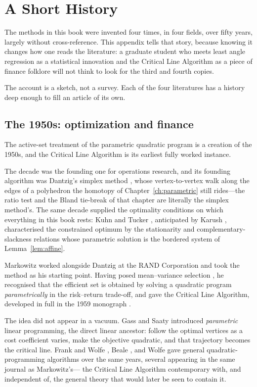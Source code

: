 \chapter{A Short History}
\label{app:history}

The methods in this book were invented four times, in four fields, over fifty years,
largely without cross-reference. This appendix tells that story, because knowing it
changes how one reads the literature: a graduate student who meets least angle
regression as a statistical innovation and the Critical Line Algorithm as a piece of
finance folklore will not think to look for the third and fourth copies.

The account is a sketch, not a survey. Each of the four literatures has a history deep
enough to fill an article of its own.

\section{The 1950s: optimization and finance}

The active-set treatment of the parametric quadratic program is a creation of the
1950s, and the Critical Line Algorithm is its earliest fully worked instance.

The decade was the founding one for operations research, and its founding algorithm was
Dantzig's simplex method \cite{dantzig1951}, whose vertex-to-vertex walk along the edges
of a polyhedron the homotopy of Chapter~\ref{ch:parametric} still rides---the ratio test
and the Bland tie-break of that chapter are literally the simplex method's. The same
decade supplied the optimality conditions on which everything in this book rests:
Kuhn and Tucker \cite{kuhntucker1951}, anticipated by Karush \cite{karush1939},
characterised the constrained optimum by the stationarity and complementary-slackness
relations whose parametric solution is the bordered system of
Lemma~\ref{lem:affine}.

Markowitz worked alongside Dantzig at the RAND Corporation and took the method as his
starting point. Having posed mean--variance selection \cite{markowitz1952}, he
recognised that the efficient set is obtained by solving a quadratic program
\emph{parametrically} in the risk--return trade-off, and \cite{markowitz1956} gave the
Critical Line Algorithm, developed in full in the 1959 monograph \cite{markowitz1959}.

The idea did not appear in a vacuum. Gass and Saaty \cite{gasssaaty1955} introduced
\emph{parametric} linear programming, the direct linear ancestor: follow the optimal
vertices as a cost coefficient varies, make the objective quadratic, and that trajectory
becomes the critical line. Frank and Wolfe \cite{frankwolfe1956}, Beale
\cite{beale1959}, and Wolfe \cite{wolfe1959} gave general quadratic-programming
algorithms over the same years, several appearing in the same journal as Markowitz's---
the Critical Line Algorithm contemporary with, and independent of, the general theory
that would later be seen to contain it.

